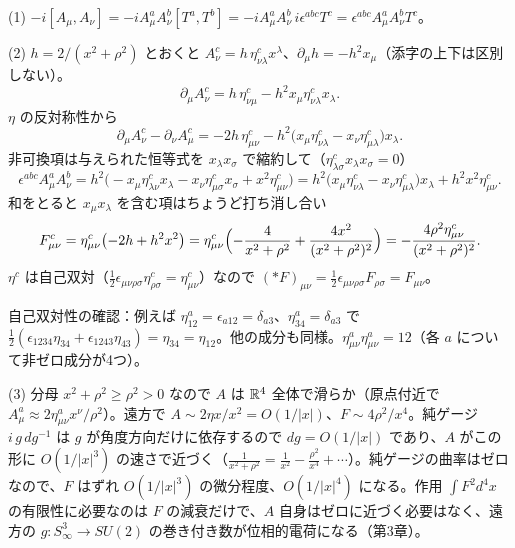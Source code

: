 \begin{solution}
(1) $-i[A_\mu,A_\nu]=-iA^a_\mu A^b_\nu[T^a,T^b]=-iA^a_\mu A^b_\nu\,i\epsilon^{abc}T^c=\epsilon^{abc}A^a_\mu A^b_\nu T^c$。

(2) $h=2/(x^2+\rho^2)$ とおくと $A^c_\nu=h\,\eta^c_{\nu\lambda}x^\lambda$、$\partial_\mu h=-h^2x_\mu$（添字の上下は区別しない）。
\[
\partial_\mu A^c_\nu=h\,\eta^c_{\nu\mu}-h^2x_\mu\eta^c_{\nu\lambda}x_\lambda .
\]
$\eta$ の反対称性から
\[
\partial_\mu A^c_\nu-\partial_\nu A^c_\mu=-2h\,\eta^c_{\mu\nu}-h^2\bigl(x_\mu\eta^c_{\nu\lambda}-x_\nu\eta^c_{\mu\lambda}\bigr)x_\lambda .
\]
非可換項は与えられた恒等式を $x_\lambda x_\sigma$ で縮約して（$\eta^c_{\lambda\sigma}x_\lambda x_\sigma=0$）
\[
\epsilon^{abc}A^a_\mu A^b_\nu=h^2\bigl(-x_\mu\eta^c_{\lambda\nu}x_\lambda-x_\nu\eta^c_{\mu\sigma}x_\sigma+x^2\eta^c_{\mu\nu}\bigr)=h^2\bigl(x_\mu\eta^c_{\nu\lambda}-x_\nu\eta^c_{\mu\lambda}\bigr)x_\lambda+h^2x^2\eta^c_{\mu\nu}.
\]
和をとると $x_\mu x_\lambda$ を含む項はちょうど打ち消し合い
\[
F^c_{\mu\nu}=\eta^c_{\mu\nu}\bigl(-2h+h^2x^2\bigr)=\eta^c_{\mu\nu}\Bigl(-\frac{4}{x^2+\rho^2}+\frac{4x^2}{(x^2+\rho^2)^2}\Bigr)=-\frac{4\rho^2\eta^c_{\mu\nu}}{(x^2+\rho^2)^2}.
\]
$\eta^c$ は自己双対（$\frac12\epsilon_{\mu\nu\rho\sigma}\eta^c_{\rho\sigma}=\eta^c_{\mu\nu}$）なので $(*F)_{\mu\nu}=\frac12\epsilon_{\mu\nu\rho\sigma}F_{\rho\sigma}=F_{\mu\nu}$。

\begin{note}
自己双対性の確認：例えば $\eta^a_{12}=\epsilon_{a12}=\delta_{a3}$、$\eta^a_{34}=\delta_{a3}$ で $\frac12(\epsilon_{1234}\eta_{34}+\epsilon_{1243}\eta_{43})=\eta_{34}=\eta_{12}$。他の成分も同様。$\eta^a_{\mu\nu}\eta^a_{\mu\nu}=12$（各 $a$ について非ゼロ成分が4つ）。
\end{note}

(3) 分母 $x^2+\rho^2\ge\rho^2>0$ なので $A$ は $\mathbb{R}^4$ 全体で滑らか（原点付近で $A^a_\mu\approx2\eta^a_{\mu\nu}x^\nu/\rho^2$）。遠方で $A\sim2\eta x/x^2=O(1/\lvert x\rvert)$、$F\sim4\rho^2/x^4$。純ゲージ $i\,g\,dg^{-1}$ は $g$ が角度方向だけに依存するので $dg=O(1/\lvert x\rvert)$ であり、$A$ がこの形に $O(1/\lvert x\rvert^3)$ の速さで近づく（$\frac{1}{x^2+\rho^2}=\frac1{x^2}-\frac{\rho^2}{x^4}+\cdots$）。純ゲージの曲率はゼロなので、$F$ はずれ $O(1/\lvert x\rvert^3)$ の微分程度、$O(1/\lvert x\rvert^4)$ になる。作用 $\int F^2d^4x$ の有限性に必要なのは $F$ の減衰だけで、$A$ 自身はゼロに近づく必要はなく、遠方の $g\colon S^3_\infty\to SU(2)$ の巻き付き数が位相的電荷になる（第3章）。
\end{solution}


